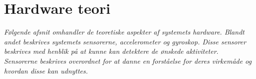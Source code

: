 \section{Hardware teori}
\textit{Følgende afsnit omhandler de teoretiske aspekter af systemets hardware. Blandt andet beskrives systemets sensorerne, accelerometer og gyroskop. Disse sensorer beskrives med henblik på at kunne kan detektere de ønskede aktiviteter. Sensorerne beskrives overordnet for at danne en forståelse for deres virkemåde og hvordan disse kan udnyttes.}
